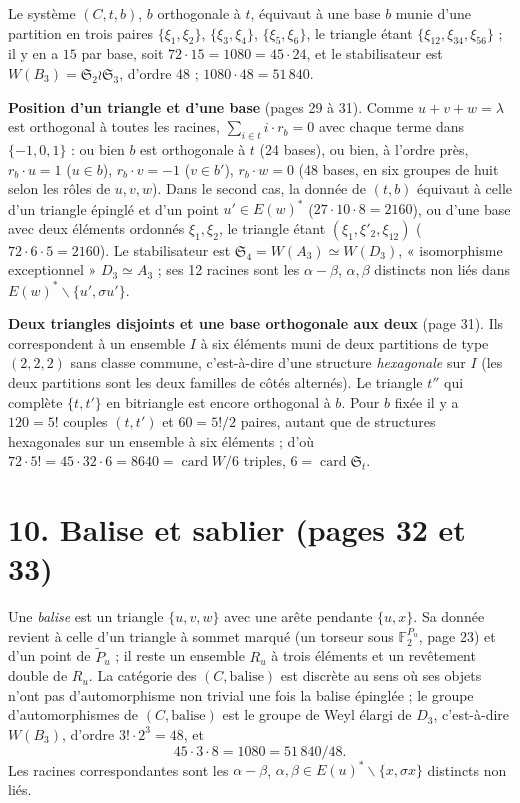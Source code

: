 \documentclass[11pt,a4paper]{article}
\begin{document}
Le système $(C, t, b)$, $b$ orthogonale à $t$, équivaut à une base $b$ munie
d'une partition en trois paires $\lbrace \xi_1, \xi_2\rbrace$, $\lbrace \xi_3,
\xi_4\rbrace$, $\lbrace \xi_5, \xi_6\rbrace$, le triangle étant $\lbrace
\xi_{12}, \xi_{34}, \xi_{56}\rbrace$ ; il y en a $15$ par base, soit $72 \cdot
15 = 1080 = 45 \cdot 24$, et le stabilisateur est $W(B_3) = \mathfrak{S}_2 \wr
\mathfrak{S}_3$, d'ordre 48 ; $1080 \cdot 48 = 51\,840$.

\textbf{Position d'un triangle et d'une base} (pages 29 à 31). Comme $u + v + w
= \lambda$ est orthogonal à toutes les racines, $\sum_{i \in t} i \cdot r_b =
0$ avec chaque terme dans $\lbrace -1, 0, 1\rbrace$ : ou bien $b$ est
orthogonale à $t$ (24 bases), ou bien, à l'ordre près, $r_b \cdot u = 1$ ($u
\in b$), $r_b \cdot v = -1$ ($v \in b'$), $r_b \cdot w = 0$ (48 bases, en six
groupes de huit selon les rôles de $u, v, w$). Dans le second cas, la donnée
de $(t, b)$ équivaut à celle d'un triangle épinglé et d'un point $u' \in
E(w)^*$ ($27 \cdot 10 \cdot 8 = 2160$), ou d'une base avec deux éléments
ordonnés $\xi_1, \xi_2$, le triangle étant $(\xi_1, \xi'_2, \xi_{12})$ ($72
\cdot 6 \cdot 5 = 2160$). Le stabilisateur est $\mathfrak{S}_4 = W(A_3) \simeq
W(D_3)$, « isomorphisme exceptionnel » $D_3 \simeq A_3$ ; ses 12 racines sont
les $\alpha - \beta$, $\alpha, \beta$ distincts non liés dans $E(w)^*
\smallsetminus \lbrace u', \sigma u'\rbrace$.

\textbf{Deux triangles disjoints et une base orthogonale aux deux} (page 31).
Ils correspondent à un ensemble $I$ à six éléments muni de deux partitions de
type $(2,2,2)$ sans classe commune, c'est-à-dire d'une structure
\emph{hexagonale} sur $I$ (les deux partitions sont les deux familles de côtés
alternés). Le triangle $t''$ qui complète $\lbrace t, t'\rbrace$ en bitriangle
est encore orthogonal à $b$. Pour $b$ fixée il y a $120 = 5!$ couples $(t,
t')$ et $60 = 5!/2$ paires, autant que de structures hexagonales sur un
ensemble à six éléments ; d'où $72 \cdot 5! = 45 \cdot 32 \cdot 6 = 8640 =
\operatorname{card} W/6$ triples, $6 = \operatorname{card}\mathfrak{S}_t$.

\section*{10. Balise et sablier (pages 32 et 33)}

Une \emph{balise} est un triangle $\lbrace u, v, w\rbrace$ avec une arête
pendante $\lbrace u, x\rbrace$. Sa donnée revient à celle d'un triangle à
sommet marqué (un torseur sous $\mathbb{F}_2^{P_u}$, page 23) et d'un point de
$\widetilde P_u$ ; il reste un ensemble $R_u$ à trois éléments et un
revêtement double de $R_u$. La catégorie des $(C, \text{balise})$ est discrète
au sens où ses objets n'ont pas d'automorphisme non trivial une fois la balise
épinglée ; le groupe d'automorphismes de $(C, \text{balise})$ est le groupe de
Weyl élargi de $D_3$, c'est-à-dire $W(B_3)$, d'ordre $3! \cdot 2^3 = 48$, et
\[
45 \cdot 3 \cdot 8 = 1080 = 51\,840 / 48 .
\]
Les racines correspondantes sont les $\alpha - \beta$, $\alpha, \beta \in
E(u)^* \smallsetminus \lbrace x, \sigma x\rbrace$ distincts non liés.
\end{document}
